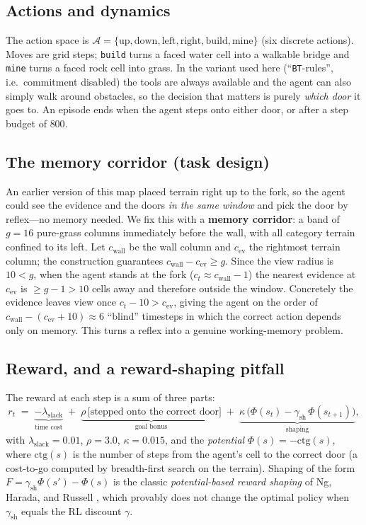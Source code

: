 \documentclass[11pt]{article}
\newcommand{\code}[1]{\texttt{\small #1}}
\newcommand{\ctg}{\mathrm{ctg}}
\begin{document}
\subsection{Actions and dynamics}
The action space is $\mathcal{A}=\{\text{up},\text{down},\text{left},
\text{right},\text{build},\text{mine}\}$ (six discrete actions). Moves are
grid steps; \code{build} turns a faced water cell into a walkable bridge and
\code{mine} turns a faced rock cell into grass. In the variant used here
(``\code{BT}-rules'', i.e.\ commitment disabled) the tools are always available
and the agent can also simply walk around obstacles, so the decision that
matters is purely \emph{which door} it goes to. An episode ends when the agent
steps onto either door, or after a step budget of $800$.

\subsection{The memory corridor (task design)}
\label{sec:memory}
An earlier version of this map placed terrain right up to the fork, so the agent
could see the evidence and the doors \emph{in the same window} and pick the door
by reflex---no memory needed. We fix this with a \textbf{memory corridor}: a band
of $g=16$ pure-grass columns immediately before the wall, with all category
terrain confined to its left. Let $c_{\text{wall}}$ be the wall column and
$c_{\text{ev}}$ the rightmost terrain column; the construction guarantees
$c_{\text{wall}}-c_{\text{ev}} \ge g$. Since the view radius is $10 < g$, when
the agent stands at the fork ($c_t \approx c_{\text{wall}}-1$) the nearest
evidence at $c_{\text{ev}}$ is $\ge g - 1 > 10$ cells away and therefore outside
the window. Concretely the evidence leaves view once $c_t - 10 > c_{\text{ev}}$,
giving the agent on the order of $c_{\text{wall}} - (c_{\text{ev}}+10)\approx 6$
``blind'' timesteps in which the correct action depends only on memory. This
turns a reflex into a genuine working-memory problem.

\subsection{Reward, and a reward-shaping pitfall}
\label{sec:reward}
The reward at each step is a sum of three parts:
\begin{equation}
r_t \;=\; \underbrace{-\lambda_{\text{slack}}}_{\text{time cost}}
\;+\; \underbrace{\rho\,\big[\text{stepped onto the correct door}\big]}_{\text{goal bonus}}
\;+\; \underbrace{\kappa\,\big(\Phi(s_{t})-\gamma_{\!\text{sh}}\,\Phi(s_{t+1})\big)}_{\text{shaping}},
\label{eq:reward}
\end{equation}
with $\lambda_{\text{slack}}=0.01$, $\rho=3.0$, $\kappa=0.015$, and the
\emph{potential} $\Phi(s) = -\ctg(s)$, where $\ctg(s)$ is the number of steps
from the agent's cell to the correct door (a cost-to-go computed by
breadth-first search on the terrain). Shaping of the form
$F = \gamma_{\!\text{sh}}\Phi(s') - \Phi(s)$ is the classic
\emph{potential-based reward shaping} of Ng, Harada, and Russell
\cite{ng1999policy}, which provably does not change the optimal policy when
$\gamma_{\!\text{sh}}$ equals the RL discount $\gamma$.
\end{document}
